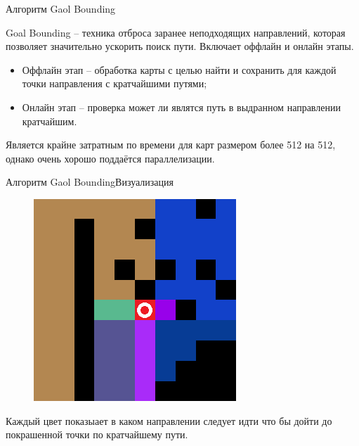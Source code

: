 \documentclass{beamer}
\begin{document}
\begin{frame}{Алгоритм Gaol Bounding}{}

Goal Bounding -- техника отброса заранее неподходящих направлений, которая позволяет значительно ускорить поиск пути. Включает оффлайн и онлайн этапы. 

\begin{itemize}
    \item Оффлайн этап -- обработка карты с целью найти и сохранить для каждой точки направления с кратчайшими путями;
    \item Онлайн этап -- проверка может ли являтся путь в выдранном направлении кратчайшим.
\end{itemize}

Является крайне затратным по времени для карт размером более 512 на 512, однако очень хорошо поддаётся параллелизации.

\end{frame}

\begin{frame}{Алгоритм Gaol Bounding}{Визуализация}

\begin{figure}
    \centering
    \includegraphics[width=0.5\linewidth]{goal_bound_visualisation.png}
\end{figure}


Каждый цвет показыает в каком направлении следует идти что бы дойти до покрашенной точки по кратчайшему пути.
\end{frame}
\end{document}
